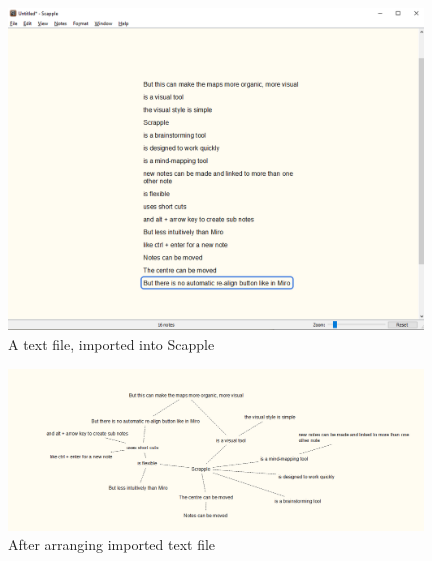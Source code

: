 \documentclass{article}
\begin{document}
\begin{figure}[htbp]
    \centering
    \includegraphics[width=11cm]{Images/Scapple002.PNG}
    \caption{A text file, imported into Scapple}
    \label{fig:Scapple text file import}
\end{figure}

\begin{figure}[htbp]
    \centering
    \includegraphics[width=11cm]{Images/Scapple003.PNG}
    \caption{After arranging imported text file}
    \label{fig:Scapple Mindmap 2}
\end{figure}
\end{document}
